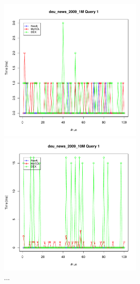 \documentclass[11pt, a4paper, oneside]{article} %
\begin{document}
\begin{appendix}
\begin{figure}[ht]
\begin{minipage}[hbt]{7cm}
	\centering
	\includegraphics[width=7cm]{../results/cold caches/images/1M_query1_perf}
	\caption{...}
	\label{fig:1M_query2_perf}
\end{minipage}
\hfill
\begin{minipage}[hbt]{7cm}
	\centering
	\includegraphics[width=7cm]{../results/cold caches/images/10M_query1_perf}
	\caption{...}
	\label{fig:10M_query1_perf}
\end{minipage}


\end{figure}
\end{appendix}
\end{document}
